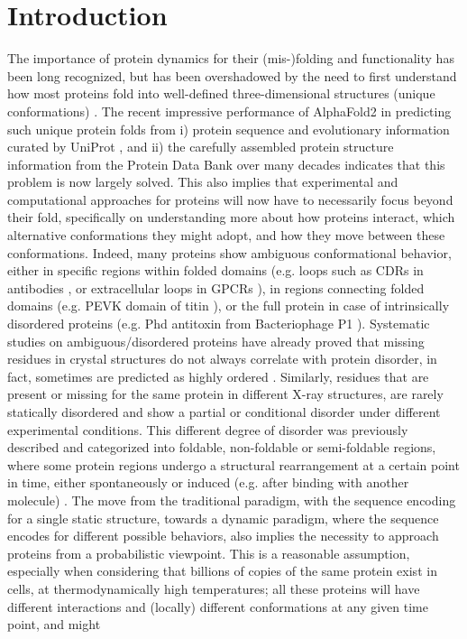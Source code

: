 \newpage

\section{Introduction}

The importance of protein dynamics for their (mis-)folding \cite{daggett_is_2003, dobson_protein_2003} and functionality \cite{karplus_molecular_2005, glazer_improving_2009} has been long recognized, but has been overshadowed by the need to first understand how most proteins fold into well-defined three-dimensional structures (unique conformations) \cite{hunkapiller_contemporary_1984, berman_worldwide_2007}. The recent impressive performance of AlphaFold2 \cite{jumper_highly_2021} in predicting such unique protein folds from i) protein sequence and evolutionary information curated by UniProt \cite{the_uniprot_consortium_uniprot_2021}, and ii) the carefully assembled protein structure information from the Protein Data Bank over many decades \cite{berman_worldwide_2007} indicates that this problem is now largely solved. This also implies that experimental and computational approaches for proteins will now have to necessarily focus beyond their fold, specifically on understanding more about how proteins interact, which alternative conformations they might adopt, and how they move between these conformations. Indeed, many proteins show ambiguous conformational behavior, either in specific regions within folded domains (e.g. loops such as CDRs in antibodies \cite{armstrong_conformational_2008}, or extracellular loops in GPCRs \cite{hilger_structure_2018}), in regions connecting folded domains (e.g. PEVK domain of titin \cite{hsin_molecular_2011}), or the full protein in case of intrinsically disordered proteins (e.g. Phd antitoxin from Bacteriophage P1 \cite{de_gieter_intrinsically_2014}). Systematic studies on ambiguous/disordered proteins have already proved that missing residues in crystal structures do not always correlate with protein disorder, in fact, sometimes are predicted as highly ordered \cite{gall_intrinsic_2007}. Similarly, residues that are present or missing for the same protein in different X-ray structures, are rarely statically disordered and show a partial or conditional disorder under different experimental conditions. This different degree of disorder was previously described and categorized into foldable, non-foldable or semi-foldable regions, where some protein regions undergo a structural rearrangement at a certain point in time, either spontaneously or induced (e.g. after binding with another molecule) \cite{uversky_unusual_2013}. The move from the traditional paradigm, with the sequence encoding for a single static structure, towards a dynamic paradigm, where the sequence encodes for different possible behaviors, also implies the necessity to approach proteins from a probabilistic viewpoint. This is a reasonable assumption, especially when considering that billions of copies of the same protein exist in cells, at thermodynamically high temperatures; all these proteins will have different interactions and (locally) different conformations at any given time point, and might 